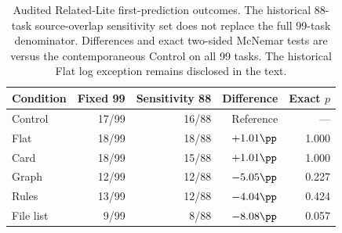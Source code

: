 \begin{table}[t]
\centering
\caption{Audited Related-Lite first-prediction outcomes. The historical 88-task source-overlap sensitivity set does not replace the full 99-task denominator. Differences and exact two-sided McNemar tests are versus the contemporaneous Control on all 99 tasks. The historical Flat log exception remains disclosed in the text.}
\label{tab:audit}
\begin{tabular}{lrrrr}
\toprule
Condition & Fixed 99 & Sensitivity 88 & Difference & Exact $p$ \\
\midrule
Control & 17/99 & 16/88 & Reference & --- \\
Flat & 18/99 & 18/88 & $+1.01\pp$ & 1.000 \\
Card & 18/99 & 15/88 & $+1.01\pp$ & 1.000 \\
Graph & 12/99 & 12/88 & $-5.05\pp$ & 0.227 \\
Rules & 13/99 & 12/88 & $-4.04\pp$ & 0.424 \\
File list & 9/99 & 8/88 & $-8.08\pp$ & 0.057 \\
\bottomrule
\end{tabular}
\end{table}

